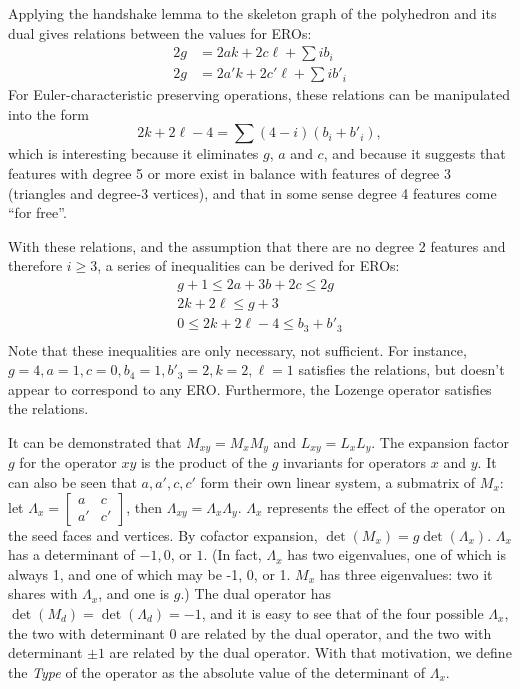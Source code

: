 \documentclass{amsart}[12pt]
\begin{document}
Applying the handshake lemma to the skeleton graph of the polyhedron and its dual gives relations between the values for EROs:
\begin{equation}
  \begin{split}
   2g &= 2ak + 2c\ell + \sum i b_i \\
   2g &= 2a'k + 2c'\ell + \sum i b'_i
 \end{split}
\end{equation}
For Euler-characteristic preserving operations, these relations can be
manipulated into the form
\begin{equation}
  2k + 2\ell - 4 = \sum (4-i) (b_i + b'_i),
\end{equation}
which is interesting because it eliminates $g$, $a$ and $c$,
and because it suggests that features with degree 5 or more exist
in balance with features of degree 3 (triangles and degree-3 vertices),
and that in some sense degree 4 features come ``for free''.

With these relations, and the assumption that there are no degree 2 features
and therefore $i \ge 3$, a series of inequalities can be derived for EROs:
\begin{equation}
  \begin{split}
  g + 1 \le 2a + 3b + 2c \le 2g \\
  2k + 2\ell \le g + 3 \\
  0 \le 2k + 2\ell - 4 \le b_3 + b'_3 \\
  \end{split}
\end{equation}
Note that these inequalities are only necessary, not sufficient. For instance,
$g=4, a=1, c=0, b_4 = 1, b'_3=2, k=2, \ell=1$ satisfies the relations, but
doesn't appear to correspond to any ERO. Furthermore, the Lozenge operator
satisfies the relations.

It can be demonstrated that $M_{xy} = M_{x}M_{y}$ and $L_{xy} = L_{x}L_{y}$.
The expansion factor $g$ for the operator $xy$ is the product of the $g$
invariants for operators $x$ and $y$. It can also be seen that $a, a', c, c'$
form their own linear system, a submatrix of $M_x$: let $\Lambda_x =
\begin{bmatrix} a & c \\ a' & c' \end{bmatrix}$, then $\Lambda_{xy} = \Lambda_x
\Lambda_y$. $\Lambda_x$ represents the effect of the operator on the seed
faces and vertices. By cofactor expansion, $\det (M_x) = g \det (\Lambda_x)$.
$\Lambda_x$ has a determinant of $-1, 0$, or $1$. (In fact, $\Lambda_x$ has two
eigenvalues, one of which is always 1, and one of which may be -1, 0, or 1.
$M_x$ has three eigenvalues: two it shares with $\Lambda_x$, and one is $g$.)
The dual operator has $\det (M_d) = \det (\Lambda_d) = -1$, and it is easy to
see that of the four possible $\Lambda_x$, the two with determinant 0 are
related by the dual operator, and the two with determinant $\pm 1$ are related
by the dual operator. With that motivation, we define the \textit{Type} of the
operator as the absolute value of the determinant of $\Lambda_x$.
\end{document}
